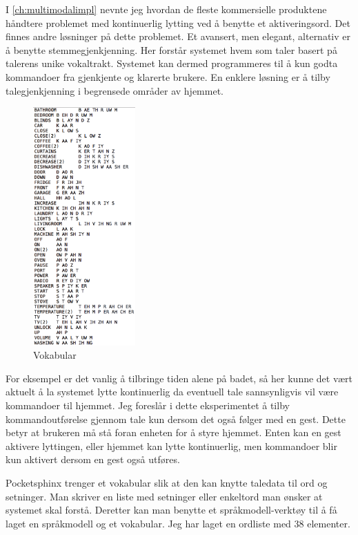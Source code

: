 I \ref{ch:multimodalimpl} nevnte jeg hvordan de fleste kommersielle produktene håndtere problemet med kontinuerlig lytting ved å benytte et aktiveringsord. Det finnes andre løsninger på dette problemet. Et avansert, men elegant, alternativ er å benytte stemmegjenkjenning. Her forstår systemet hvem som taler basert på talerens unike vokaltrakt. Systemet kan dermed programmeres til å kun godta kommandoer fra gjenkjente og klarerte brukere. En enklere løsning er å tilby talegjenkjenning i begrensede områder av hjemmet.
\begin{figure}
    \vspace{-20pt}
  \begin{center}
    \includegraphics[width=0.35\textwidth]{fig/dictionary}
  \end{center}
  \vspace{-20pt}
  \caption{Vokabular}
  \label{fig:vokabular}
  \vspace{-7pt}
\end{figure}
For eksempel er det vanlig å tilbringe tiden alene på badet, så her kunne det vært aktuelt å la systemet lytte kontinuerlig da eventuell tale sannsynligvis vil være kommandoer til hjemmet. Jeg foreslår i dette eksperimentet å tilby kommandoutførelse gjennom tale kun dersom det også følger med en gest. Dette betyr at brukeren må stå foran enheten for å styre hjemmet. Enten kan en gest aktivere lyttingen, eller hjemmet kan lytte kontinuerlig, men kommandoer blir kun aktivert dersom en gest også utføres.

Pocketsphinx trenger et vokabular slik at den kan knytte taledata til ord og setninger. Man skriver en liste med setninger eller enkeltord man ønsker at systemet skal forstå. Deretter kan man benytte et språkmodell-verktøy til å få laget en språkmodell og et vokabular. Jeg har laget en ordliste med 38 elementer.

